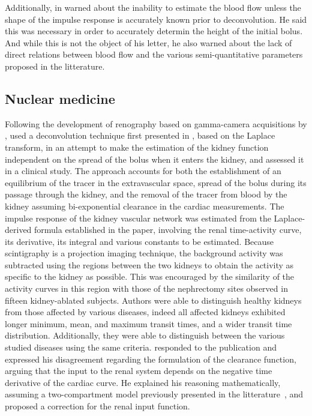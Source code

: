 Additionally, in \citeyear{Lassen:1984kp} \citet{Lassen:1984kp} warned about the inability to estimate the blood flow unless the shape of the impulse response is accurately known prior to deconvolution.
He said this was necessary in order to accurately determin the height of the initial bolus.
And while this is not the object of his letter, he also warned about the lack of direct relations between blood flow and the various semi-quantitative parameters proposed in the litterature.

\subsection{Nuclear medicine}
Following the development of renography based on gamma-camera acquisitions by \citet{Short:1973ip}, \citet{Kenny:1975gl} used a deconvolution technique first presented in \cite{Fleming:1974id}, based on the Laplace transform, in an attempt to make the estimation of the kidney function independent on the spread of the bolus when it enters the kidney, and assessed it in a clinical study.
The approach accounts for both the establishment of an equilibrium of the tracer in the extravascular space, spread of the bolus during its passage through the kidney, and the removal of the tracer from blood by the kidney assuming bi-exponential clearance in the cardiac measurements.
The impulse response of the kidney vascular network was estimated from the Laplace-derived formula established in the paper, involving the renal time-activity curve, its derivative, its integral and various constants to be estimated.
Because scintigraphy is a projection imaging technique, the background activity was subtracted using the regions between the two kidneys to obtain the activity as specific to the kidney as possible.
This was encouraged by the similarity of the activity curves in this region with those of the nephrectomy sites observed in fifteen kidney-ablated subjects.
Authors were able to distinguish healthy kidneys from those affected by various diseases, indeed all affected kidneys exhibited longer minimum, mean, and maximum transit times, and a wider transit time distribution.
Additionally, they were able to distinguish between the various studied diseases using the same criteria.
\citet{Appledorn:1977hl} responded to the publication and expressed his disagreement regarding the formulation of the clearance function, arguing that the input to the renal system depends on the negative time derivative of the cardiac curve.
He explained his reasoning mathematically, assuming a two-compartment model previously presented in the litterature~\cite{DeGrazia:1974uo}, and proposed a correction for the renal input function. 

